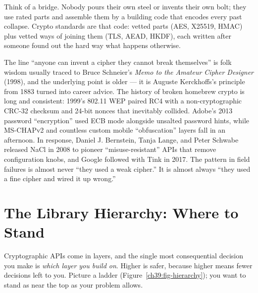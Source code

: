 \begin{intuitionbox}
Think of a bridge. Nobody pours their own steel or invents their own bolt; they
use rated parts and assemble them by a building code that encodes every past
collapse. Crypto standards are that code: vetted parts (AES, X25519, HMAC) plus
vetted ways of joining them (TLS, AEAD, HKDF), each written after someone found
out the hard way what happens otherwise.
\end{intuitionbox}

\begin{historybox}
The line ``anyone can invent a cipher they cannot break themselves'' is folk
wisdom usually traced to Bruce Schneier's \emph{Memo to the Amateur Cipher
Designer} (1998), and the underlying point is older --- it is Auguste Kerckhoffs's
principle from 1883 turned into career advice. The history of broken homebrew
crypto is long and consistent: 1999's 802.11 WEP paired RC4 with a
non-cryptographic CRC-32 checksum and 24-bit nonces that inevitably collided.
Adobe's 2013 password ``encryption'' used ECB mode alongside unsalted password hints,
while MS-CHAPv2 and countless custom mobile ``obfuscation'' layers fall in an afternoon. In response, Daniel J.
Bernstein, Tanja Lange, and Peter Schwabe released NaCl in 2008 to pioneer
``misuse-resistant'' APIs that remove configuration knobs, and Google followed
with Tink in 2017. The pattern in field failures is almost never ``they used a
weak cipher.'' It is almost always ``they used a fine cipher and wired it up wrong.''
\end{historybox}

\section{The Library Hierarchy: Where to Stand}
\label{ch39:hierarchy}

Cryptographic APIs come in layers, and the single most consequential decision you
make is \emph{which layer you build on}. Higher is safer, because higher means
fewer decisions left to you. Picture a ladder (Figure~\ref{ch39:fig-hierarchy}); you want to stand as near the top
as your problem allows.

